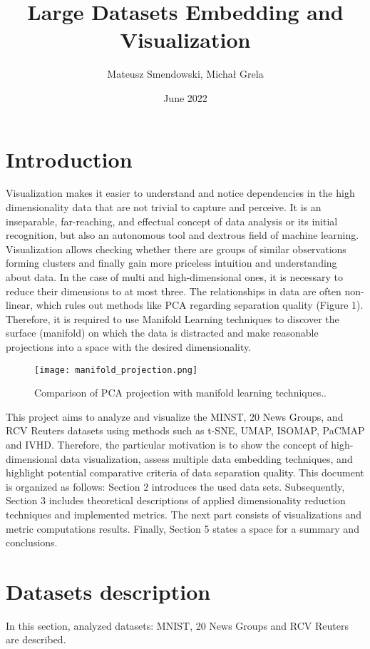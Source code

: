 \documentclass[12pt]{article}
\title{Large Datasets Embedding and Visualization}
\author{Mateusz Smendowski, Michał Grela}
\date{June 2022}
\begin{document}
\maketitle

\section{Introduction}
Visualization makes it easier to understand and notice dependencies in the high dimensionality data that are not trivial to capture and perceive. It is an inseparable, far-reaching, and effectual concept of data analysis or its initial recognition, but also an autonomous tool and dextrous field of machine learning. Visualization allows checking whether there are groups of similar observations forming clusters and finally gain more priceless intuition and understanding about data. In the case of multi and high-dimensional ones, it is necessary to reduce their dimensions to at most three. The relationships in data are often non-linear, which rules out methods like PCA regarding separation quality (Figure 1). Therefore, it is required to use Manifold Learning techniques to discover the surface (manifold) on which the data is distracted and make reasonable projections into a space with the desired dimensionality.

\begin{figure}[h]
    \centering
    \texttt{[image: manifold\_projection.png]}
    \caption{Comparison of PCA projection with manifold learning techniques..}
    \label{fig:mnist_visualization}
\end{figure}

This project aims to analyze and visualize the MINST, 20 News Groups, and RCV Reuters datasets using methods such as t-SNE, UMAP, ISOMAP, PaCMAP and IVHD. Therefore, the particular motivation is to show the concept of high-dimensional data visualization, assess multiple data embedding techniques, and highlight potential comparative criteria of data separation quality. This document is organized as follows: Section 2 introduces the used data sets. Subsequently, Section 3 includes theoretical descriptions of applied dimensionality reduction techniques and implemented metrics. The next part consists of visualizations and metric computations results. Finally, Section 5 states a space for a summary and conclusions.

\section{Datasets description}
In this section, analyzed datasets: MNIST, 20 News Groups and RCV Reuters are described.
\end{document}
